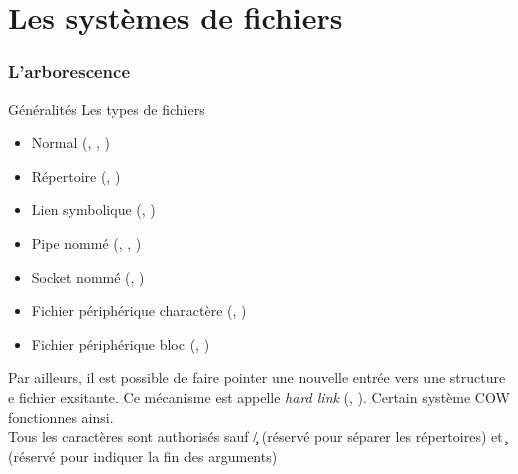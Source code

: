 %
%
%

\part{Les systèmes de fichiers}

\begin{frame}
  \partpage
\end{frame}

\begin{frame}
  \tableofcontents[currentpart]
\end{frame}

\section{L'arborescence}

\begin{frame}[fragile=singleslide]{Généralités}
  Les types de fichiers
  \begin{itemize}
  \item Normal (, , )
  \item Répertoire (, )
  \item Lien symbolique (, )
  \item Pipe nommé (, , )
  \item Socket nommé (, )
  \item Fichier périphérique charactère (, )
  \item Fichier périphérique bloc (, )
  \end{itemize}

  Par ailleurs, il  est possible de faire pointer  une nouvelle entrée
  vers  une structure e  fichier exsitante.  Ce mécanisme  est appelle
  \emph{hard link} (, ). Certain système COW
  fonctionnes ainsi.
  \\
  Tous  les  caractères  sont  authorisés  sauf  \c{/}  (réservé  pour
  séparer les  répertoires) et \c{\0}  (réservé pour indiquer  la fin
  des arguments)
\end{frame}


